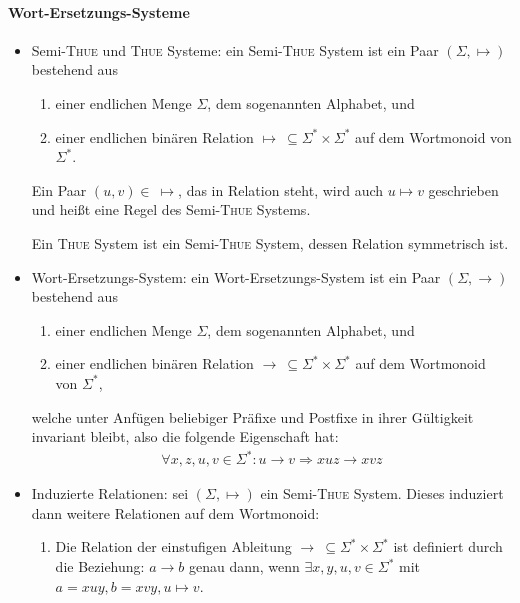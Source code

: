 \documentclass[
  a4paper,
  11pt,
]{scrartcl}
\begin{document}
\paragraph{Wort-Ersetzungs-Systeme}
\label{par:wort_ersetzungs_systeme}

\begin{itemize}
  \item Semi-\textsc{Thue} und \textsc{Thue} Systeme: ein Semi-\textsc{Thue}
    System ist ein Paar $(\Sigma, \mapsto)$ bestehend aus
    \begin{enumerate}
      \item einer endlichen Menge $\Sigma$, dem sogenannten Alphabet, und
      \item einer endlichen binären Relation $\mapsto \ \subseteq \Sigma^*
        \times \Sigma^*$ auf dem Wortmonoid von $\Sigma^*$.
    \end{enumerate}

    Ein Paar $(u, v) \in \ \mapsto$, das in Relation steht, wird auch $u \mapsto
    v$ geschrieben und heißt eine Regel des Semi-\textsc{Thue} Systems.

    Ein \textsc{Thue} System ist ein Semi-\textsc{Thue} System, dessen Relation
    symmetrisch ist.

  \item Wort-Ersetzungs-System: ein Wort-Ersetzungs-System ist ein Paar
    $(\Sigma, \rightarrow)$ bestehend aus
    \begin{enumerate}
      \item einer endlichen Menge $\Sigma$, dem sogenannten Alphabet, und
      \item einer endlichen binären Relation $\rightarrow\ \subseteq \Sigma^*
        \times \Sigma^*$ auf dem Wortmonoid von $\Sigma^*$,
    \end{enumerate}
    welche unter Anfügen beliebiger Präfixe und Postfixe in ihrer Gültigkeit
    invariant bleibt, also die folgende Eigenschaft hat:
    \begin{align*}
      \forall x,z,u,v \in \Sigma^*:
      u \rightarrow v \Rightarrow xuz \rightarrow xvz
    \end{align*}

  \item Induzierte Relationen: sei $(\Sigma, \mapsto)$ ein Semi-\textsc{Thue}
    System. Dieses induziert dann weitere Relationen auf dem Wortmonoid:
    \begin{enumerate}
      \item Die Relation der einstufigen Ableitung $\rightarrow \ \subseteq
        \Sigma^* \times \Sigma^*$ ist definiert durch die Beziehung: $a
        \rightarrow b$ genau dann, wenn $\exists x,y,u,v \in \Sigma^*$ mit
        $a = x u y, b = x v y, u \mapsto v$.


\end{enumerate}
\end{itemize}
\end{document}
